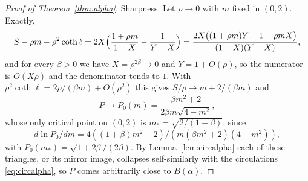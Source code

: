 \documentclass[11pt]{article}
\theoremstyle{definition}
\begin{document}
\begin{proof}[Proof of Theorem~\ref{thm:alpha}]
Sharpness. Let $\rho \to 0$ with $m$ fixed in $(0, 2)$. Exactly,
\[
S - \rho m - \rho^2\coth\ell = 2X\Bigl(\frac{1 + \rho m}{1 - X} - \frac{1}{Y - X}\Bigr) = \frac{2X\bigl((1 + \rho m)Y - 1 - \rho m X\bigr)}{(1 - X)(Y - X)},
\]
and for every $\beta > 0$ we have $X = \rho^{2\beta} \to 0$ and $Y = 1 + O(\rho)$, so the numerator is $O(X\rho)$ and the denominator tends to $1$. With $\rho^2\coth\ell = 2\rho/(\beta m) + O(\rho^2)$ this gives $S/\rho \to m + 2/(\beta m)$ and
\[
P \to P_0(m) = \frac{\beta m^2 + 2}{2\beta m\sqrt{4 - m^2}},
\]
whose only critical point on $(0, 2)$ is $m_* = \sqrt{2/(1 + \beta)}$, since
\[
 d\ln P_0/dm = 4((1 + \beta)m^2 - 2)/(m(\beta m^2 + 2)(4 - m^2)),
\]
with $P_0(m_*) = \sqrt{1 + 2\beta}/(2\beta)$. By Lemma~\ref{lem:circalpha} each of these triangles, or its mirror image, collapses self-similarly with the circulations \eqref{eq:circalpha}, so $P$ comes arbitrarily close to $B(\alpha)$.
\end{proof}
\end{document}
